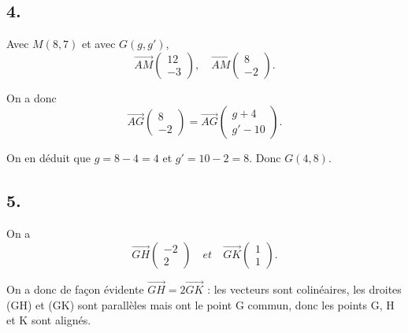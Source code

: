 \documentclass[10pt]{article}
\begin{document}
	\subsection*{4.}
	
	Avec \(M(8, 7)\) et avec \(G(g, g')\),
	\[
	\overrightarrow{AM} \left( \begin{array}{c} 12 \\ -3 \end{array} \right), \quad \overrightarrow{AM} \left( \begin{array}{c} 8 \\ -2 \end{array} \right).
	\]
	
	On a donc
	\[
	\overrightarrow{AG} \left( \begin{array}{c} 8 \\ -2 \end{array} \right) = \overrightarrow{AG} \left( \begin{array}{c} g + 4 \\ g' - 10 \end{array} \right).
	\]
	
	On en déduit que \(g = 8 - 4 = 4\) et \(g' = 10 - 2 = 8\). Donc \(G(4, 8)\).
	
	\subsection*{5.}
	
	On a
	\[
	\overrightarrow{GH} \left( \begin{array}{c} -2 \\ 2 \end{array} \right) \quad et \quad \overrightarrow{GK} \left( \begin{array}{c} 1 \\ 1 \end{array} \right).
	\]
	
	On a donc de façon évidente \(\overrightarrow{GH} = 2 \overrightarrow{GK}\) : les vecteurs sont colinéaires, les droites (GH) et (GK) sont parallèles mais ont le point G commun, donc les points G, H et K sont alignés.
\end{document}
